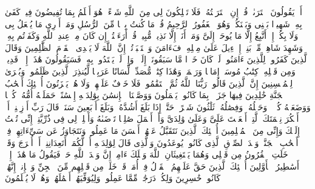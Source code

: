 أَمۡ یَقُولُونَ ٱفۡتَرَىٰهُۖ قُلۡ إِنِ ٱفۡتَرَیۡتُهُۥ فَلَا تَمۡلِكُونَ لِی مِنَ ٱللَّهِ شَیۡءًاۖ هُوَ أَعۡلَمُ بِمَا تُفِیضُونَ فِیهِۚ كَفَىٰ بِهِۦ شَهِیدَۢا بَیۡنِی وَبَیۡنَكُمۡۖ وَهُوَ ٱلۡغَفُورُ ٱلرَّحِیمُ%
\stopbuffer%
\startbuffer[\q:46:9]
قُلۡ مَا كُنتُ بِدۡعࣰا مِّنَ ٱلرُّسُلِ وَمَاۤ أَدۡرِی مَا یُفۡعَلُ بِی وَلَا بِكُمۡۖ إِنۡ أَتَّبِعُ إِلَّا مَا یُوحَىٰۤ إِلَیَّ وَمَاۤ أَنَا۠ إِلَّا نَذِیرࣱ مُّبِینࣱ%
\stopbuffer%
\startbuffer[\q:46:10]
قُلۡ أَرَءَیۡتُمۡ إِن كَانَ مِنۡ عِندِ ٱللَّهِ وَكَفَرۡتُم بِهِۦ وَشَهِدَ شَاهِدࣱ مِّنۢ بَنِیۤ إِسۡرَٰۤءِیلَ عَلَىٰ مِثۡلِهِۦ فَءَامَنَ وَٱسۡتَكۡبَرۡتُمۡۚ إِنَّ ٱللَّهَ لَا یَهۡدِی ٱلۡقَوۡمَ ٱلظَّٰلِمِینَ%
\stopbuffer%
\startbuffer[\q:46:11]
وَقَالَ ٱلَّذِینَ كَفَرُوا۟ لِلَّذِینَ ءَامَنُوا۟ لَوۡ كَانَ خَیۡرࣰا مَّا سَبَقُونَاۤ إِلَیۡهِۚ وَإِذۡ لَمۡ یَهۡتَدُوا۟ بِهِۦ فَسَیَقُولُونَ هَٰذَاۤ إِفۡكࣱ قَدِیمࣱ%
\stopbuffer%
\startbuffer[\q:46:12]
وَمِن قَبۡلِهِۦ كِتَٰبُ مُوسَىٰۤ إِمَامࣰا وَرَحۡمَةࣰۚ وَهَٰذَا كِتَٰبࣱ مُّصَدِّقࣱ لِّسَانًا عَرَبِیࣰّا لِّیُنذِرَ ٱلَّذِینَ ظَلَمُوا۟ وَبُشۡرَىٰ لِلۡمُحۡسِنِینَ%
\stopbuffer%
\startbuffer[\q:46:13]
إِنَّ ٱلَّذِینَ قَالُوا۟ رَبُّنَا ٱللَّهُ ثُمَّ ٱسۡتَقَٰمُوا۟ فَلَا خَوۡفٌ عَلَیۡهِمۡ وَلَا هُمۡ یَحۡزَنُونَ%
\stopbuffer%
\startbuffer[\q:46:14]
أُو۟لَٰۤئِكَ أَصۡحَٰبُ ٱلۡجَنَّةِ خَٰلِدِینَ فِیهَا جَزَاۤءَۢ بِمَا كَانُوا۟ یَعۡمَلُونَ%
\stopbuffer%
\startbuffer[\q:46:15]
وَوَصَّیۡنَا ٱلۡإِنسَٰنَ بِوَٰلِدَیۡهِ إِحۡسَٰنًاۖ حَمَلَتۡهُ أُمُّهُۥ كُرۡهࣰا وَوَضَعَتۡهُ كُرۡهࣰاۖ وَحَمۡلُهُۥ وَفِصَٰلُهُۥ ثَلَٰثُونَ شَهۡرًاۚ حَتَّىٰۤ إِذَا بَلَغَ أَشُدَّهُۥ وَبَلَغَ أَرۡبَعِینَ سَنَةࣰ قَالَ رَبِّ أَوۡزِعۡنِیۤ أَنۡ أَشۡكُرَ نِعۡمَتَكَ ٱلَّتِیۤ أَنۡعَمۡتَ عَلَیَّ وَعَلَىٰ وَٰلِدَیَّ وَأَنۡ أَعۡمَلَ صَٰلِحࣰا تَرۡضَىٰهُ وَأَصۡلِحۡ لِی فِی ذُرِّیَّتِیۤۖ إِنِّی تُبۡتُ إِلَیۡكَ وَإِنِّی مِنَ ٱلۡمُسۡلِمِینَ%
\stopbuffer%
\startbuffer[\q:46:16]
أُو۟لَٰۤئِكَ ٱلَّذِینَ نَتَقَبَّلُ عَنۡهُمۡ أَحۡسَنَ مَا عَمِلُوا۟ وَنَتَجَاوَزُ عَن سَیِّءَاتِهِمۡ فِیۤ أَصۡحَٰبِ ٱلۡجَنَّةِۖ وَعۡدَ ٱلصِّدۡقِ ٱلَّذِی كَانُوا۟ یُوعَدُونَ%
\stopbuffer%
\startbuffer[\q:46:17]
وَٱلَّذِی قَالَ لِوَٰلِدَیۡهِ أُفࣲّ لَّكُمَاۤ أَتَعِدَانِنِیۤ أَنۡ أُخۡرَجَ وَقَدۡ خَلَتِ ٱلۡقُرُونُ مِن قَبۡلِی وَهُمَا یَسۡتَغِیثَانِ ٱللَّهَ وَیۡلَكَ ءَامِنۡ إِنَّ وَعۡدَ ٱللَّهِ حَقࣱّ فَیَقُولُ مَا هَٰذَاۤ إِلَّاۤ أَسَٰطِیرُ ٱلۡأَوَّلِینَ%
\stopbuffer%
\startbuffer[\q:46:18]
أُو۟لَٰۤئِكَ ٱلَّذِینَ حَقَّ عَلَیۡهِمُ ٱلۡقَوۡلُ فِیۤ أُمَمࣲ قَدۡ خَلَتۡ مِن قَبۡلِهِم مِّنَ ٱلۡجِنِّ وَٱلۡإِنسِۖ إِنَّهُمۡ كَانُوا۟ خَٰسِرِینَ%
\stopbuffer%
\startbuffer[\q:46:19]
وَلِكُلࣲّ دَرَجَٰتࣱ مِّمَّا عَمِلُوا۟ۖ وَلِیُوَفِّیَهُمۡ أَعۡمَٰلَهُمۡ وَهُمۡ لَا یُظۡلَمُونَ%
\stopbuffer%
